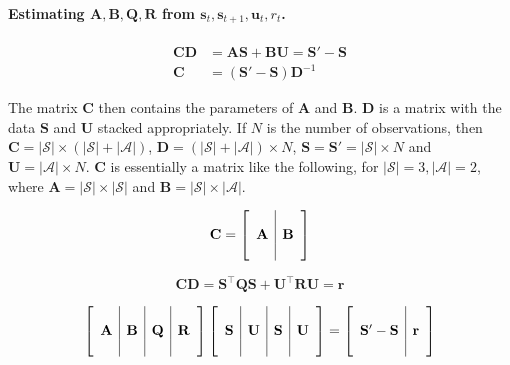 \paragraph{Estimating $\mathbf{A}, \mathbf{B}, \mathbf{Q}, \mathbf{R}$ from $\bm{s}_t, \bm{s}_{t+1}, \bm{u}_t, r_t$.}

\begin{align*}
    \mathbf{C}\mathbf{D} &= \mathbf{A}\mathbf{S}+\mathbf{B}\mathbf{U} = \mathbf{S}'-\mathbf{S}\\
    \mathbf{C} &= (\mathbf{S}'-\mathbf{S})\mathbf{D}^{-1}
\end{align*}

The matrix $\mathbf{C}$ then contains the parameters of $\mathbf{A}$ and $\mathbf{B}$. $\mathbf{D}$ is a matrix with the data $\mathbf{S}$ and $\mathbf{U}$ stacked appropriately. If $N$ is the number of observations, then $\mathbf{C}=|\mathcal{S}|\times (|\mathcal{S}|+|\mathcal{A}|)$, $\mathbf{D}=(|\mathcal{S}|+|\mathcal{A}|)\times N$, $\mathbf{S}=\mathbf{S}'=|\mathcal{S}|\times N$ and $\mathbf{U}=|\mathcal{A}|\times N$. $\mathbf{C}$ is essentially a matrix like the following, for $|\mathcal{S}|=3, |\mathcal{A}|=2$, where $\mathbf{A}=|\mathcal{S}|\times|\mathcal{S}|$ and $\mathbf{B}=|\mathcal{S}|\times|\mathcal{A}|$.

\begin{equation}
 \mathbf{C}=\left[ 
 \begin{array}{c | c} 
     & \\ 
     \mathbf{A} &\mathbf{B}\\ 
     & 
  \end{array}
\right] 
\end{equation}

\begin{equation}
    \mathbf{C}\mathbf{D} = \mathbf{S}^\top\mathbf{Q}\mathbf{S}+\mathbf{U}^\top \mathbf{R}\mathbf{U}    = \bm{r}
\end{equation}

\begin{equation}
\left[ 
 \begin{array}{c | c | c | c} 
     &&& \\ 
     \mathbf{A} &\mathbf{B} & \mathbf{Q} & \mathbf{R}\\ 
     &&&
  \end{array}
\right]  \left[ 
 \begin{array}{c | c | c | c} 
     &&& \\ 
     \mathbf{S} &\mathbf{U} & \mathbf{S} & \mathbf{U}\\ 
     &&& 
  \end{array}
\right] = \left[ 
 \begin{array}{c | c} 
     & \\ 
     \mathbf{S'}-\mathbf{S} &\mathbf{r}\\ 
     & 
  \end{array}
\right] 
\end{equation}

